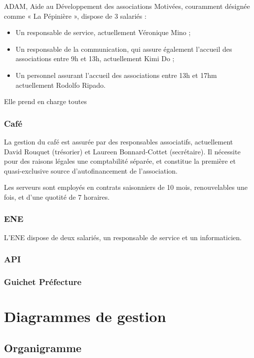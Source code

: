 ADAM, Aide au Développement des associations Motivées, couramment désignée comme « La Pépinière », dispose de 3 salariés :
\begin{itemize}
\item Un responsable de service, actuellement Véronique Mino ;
\item Un responsable de la communication, qui assure également l'accueil
      des associations entre 9h et 13h, actuellement Kimi Do ;
\item Un personnel assurant l'accueil des associations entre 13h et 17hm
      actuellement Rodolfo Ripado.
\end{itemize}

Elle prend en charge toutes

\subsubsection{Café}

La gestion du café est assurée par des responsables associatifs, actuellement
David Rouquet (trésorier) et Laureen Bonnard-Cottet (secrétaire).
Il nécessite pour des raisons légales une comptabilité séparée,
et constitue la première et quasi-exclusive source d'autofinancement de
l'association.

Les serveurs sont employés en contrats saisonniers de 10 mois, renouvelables
une fois, et d'une quotité de 7 horaires.

\subsubsection{ENE}

L'ENE dispose de deux salariés, un responsable de service et un informaticien.

\subsubsection{API}

\subsubsection{Guichet Préfecture}

\section{Diagrammes de gestion}
\subsection{Organigramme}

